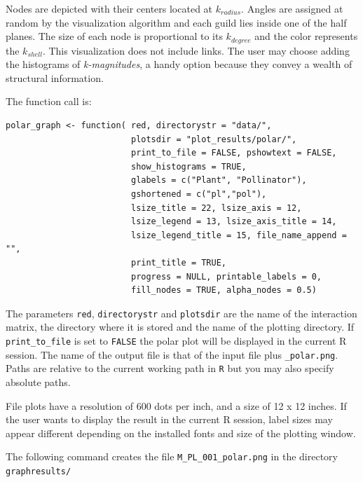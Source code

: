\documentclass[12pt]{article}
\begin{document}
Nodes are depicted with their centers located at $k_{radius}$. Angles are assigned at random by the visualization algorithm and each guild lies inside one of the half planes. The size of each node is proportional to its $k_{degree}$ and the color represents the $k_{shell}$. This visualization does not include links. The user may choose adding the histograms of \textit{k-magnitudes}, a handy option because they convey a wealth of structural information.


\noindent The function call is:

\fontsize{3.5mm}{3.5mm}\selectfont
\begin{verbatim}
polar_graph <- function( red, directorystr = "data/", 
                         plotsdir = "plot_results/polar/", 
                         print_to_file = FALSE, pshowtext = FALSE,
                         show_histograms = TRUE, 
                         glabels = c("Plant", "Pollinator"),
                         gshortened = c("pl","pol"),
                         lsize_title = 22, lsize_axis = 12, 
                         lsize_legend = 13, lsize_axis_title = 14, 
                         lsize_legend_title = 15, file_name_append = "",
                         print_title = TRUE,
                         progress = NULL, printable_labels = 0, 
                         fill_nodes = TRUE, alpha_nodes = 0.5)
\end{verbatim}
\normalsize

The parameters \texttt{red}, \texttt{directorystr} and \texttt{plotsdir} are the name of the interaction matrix, the directory where it is stored and the name of the plotting directory. If \texttt{print\_to\_file} is set to \texttt{FALSE} the polar plot will be displayed in the current R session. The name of the output file is that of the input file
plus \texttt{\_polar.png}. Paths are relative to the current working path in \texttt{R} but you may also specify absolute paths.

File plots have a resolution of 600 dots per inch, and a size of 12 x 12 inches. If the user wants to display the result in the current R session, label sizes may appear different depending on the installed fonts and size of the plotting window.

The following command creates the file \texttt{M\_PL\_001\_polar.png} in the directory \texttt{graphresults/}
\end{document}
